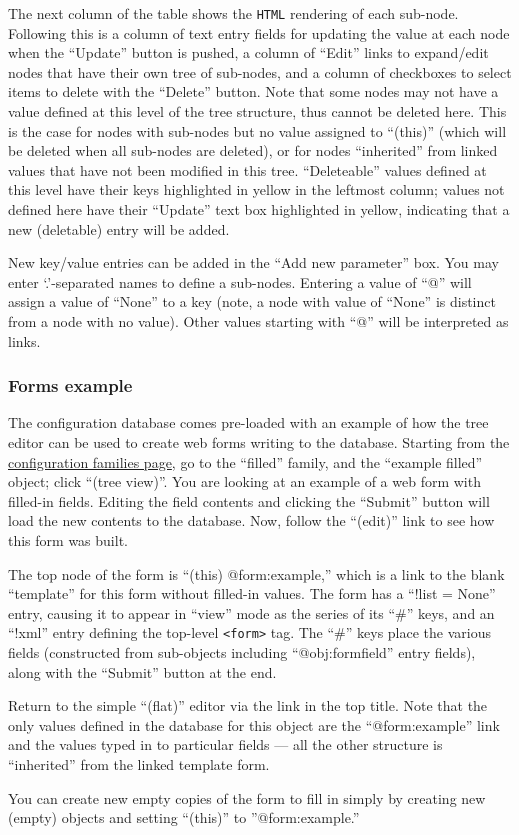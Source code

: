 \documentclass[12pt,english]{article}
\newcommand{\cd}[1]{\texttt{#1}}
\begin{document}
The next column of the table shows the \cd{HTML} rendering of each sub-node.
Following this is a column of text entry fields for updating the value
	at each node when the ``Update'' button is pushed,
	a column of ``Edit'' links to expand/edit nodes that have their own tree of sub-nodes,
	and a column of checkboxes to select items to delete with the ``Delete'' button.
Note that some nodes may not have a value defined at this level of the tree structure,
	thus cannot be deleted here.
This is the case for nodes with sub-nodes but no value assigned to ``(this)'' (which will be deleted when all sub-nodes are deleted),
	or for nodes ``inherited'' from linked values that have not been modified in this tree.
``Deleteable'' values defined at this level have their keys highlighted in yellow in the leftmost column;
	values not defined here have their ``Update'' text box highlighted in yellow,
	indicating that a new (deletable) entry will be added.

New key/value entries can be added in the ``Add new parameter'' box.
You may enter `.'-separated names to define a sub-nodes.
Entering a value of ``@'' will assign a value of ``None'' to a key
	(note, a node with value of ``None'' is distinct from a node with no value).
Other values starting with ``@'' will be interpreted as links.

%
\subsubsection{Forms example}

The configuration database comes pre-loaded with an example of how the tree editor can be used to create web forms writing to the database.
Starting from the \href{http://localhost:8001/cgi-config/ConfigWebManager.py}{configuration families page},
	go to the ``filled'' family, and the ``example filled'' object; click ``(tree view)''.
You are looking at an example of a web form with filled-in fields.
Editing the field contents and clicking the ``Submit'' button will load the new contents to the database.
Now, follow the ``(edit)'' link to see how this form was built.

The top node of the form is ``(this) @form:example,'' which is a link to the blank ``template'' for this form
	without filled-in values.
The form has a ``!list = None'' entry, causing it to appear in ``view'' mode as the series of its ``\#'' keys,
	and an ``!xml'' entry defining the top-level \verb#<form># tag.
The ``\#'' keys place the various fields (constructed from sub-objects including ``@obj:formfield'' entry fields),
	along with the ``Submit'' button at the end.

Return to the simple ``(flat)'' editor via the link in the top title.
Note that the only values defined in the database for this object are the ``@form:example'' link
	and the values typed in to particular fields --- all the other structure is ``inherited''
	from the linked template form.

You can create new empty copies of the form to fill in simply by creating new (empty) objects
	and setting ``(this)'' to ''@form:example.''
\end{document}
